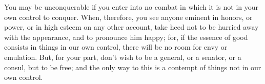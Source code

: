 You may be unconquerable if you enter into no combat in which it is not in your
own control to  conquer. When, therefore, you see anyone  eminent in honors, or
power, or in high esteem on any other account, take heed not to be hurried away
with the appearance,  and to pronounce him  happy; for, if the  essence of good
consists  in things  in our  own control,  there will  be no  room for  envy or
emulation. But, for your  part, don't wish to be a general, or  a senator, or a
consul, but to be free; and the only way to this is a contempt of things not in
our own control.
